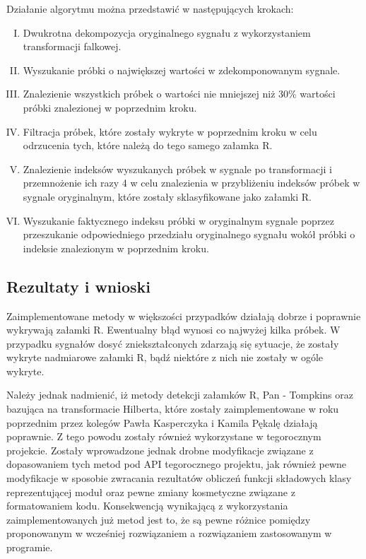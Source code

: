 Działanie algorytmu można przedstawić w następujących krokach:
\begin{enumerate}[I.]
\item Dwukrotna dekompozycja oryginalnego sygnału z wykorzystaniem transformacji falkowej.
\item Wyszukanie próbki o największej wartości w zdekomponowanym sygnale.
\item Znalezienie wszystkich próbek o wartości nie mniejszej niż 30\% wartości próbki znalezionej w poprzednim kroku.
\item Filtracja próbek, które zostały wykryte w poprzednim kroku w celu odrzucenia tych, które należą do tego samego załamka R.
\item Znalezienie indeksów wyszukanych próbek w sygnale po transformacji i przemnożenie ich razy 4 w celu znalezienia w przybliżeniu indeksów próbek w sygnale oryginalnym, które zostały sklasyfikowane jako załamki R.
\item Wyszukanie faktycznego indeksu próbki w oryginalnym sygnale poprzez przeszukanie odpowiedniego przedziału oryginalnego sygnału wokół próbki o indeksie znalezionym w poprzednim kroku.
\end{enumerate}
\subsection{Rezultaty i wnioski}
Zaimplementowane metody w większości przypadków działają dobrze i poprawnie wykrywają załamki R. Ewentualny błąd wynosi co najwyżej kilka próbek. W przypadku sygnałów dosyć zniekształconych zdarzają się sytuacje, że zostały wykryte nadmiarowe załamki R, bądź niektóre z nich nie zostały w ogóle wykryte.

Należy jednak nadmienić, iż metody detekcji załamków R, Pan - Tompkins oraz bazująca na transformacie Hilberta, które zostały zaimplementowane w roku poprzednim przez kolegów Pawła Kasperczyka i Kamila Pękalę działają poprawnie. Z tego powodu zostały również wykorzystane w tegorocznym projekcie. Zostały wprowadzone jednak drobne modyfikacje związane z dopasowaniem tych metod pod API tegorocznego projektu, jak również pewne modyfikacje w sposobie zwracania rezultatów obliczeń funkcji składowych klasy reprezentującej moduł oraz pewne zmiany kosmetyczne związane z formatowaniem kodu. Konsekwencją wynikającą z wykorzystania zaimplementowanych już metod jest to, że są pewne różnice pomiędzy proponowanym w wcześniej rozwiązaniem a rozwiązaniem zastosowanym w programie.

